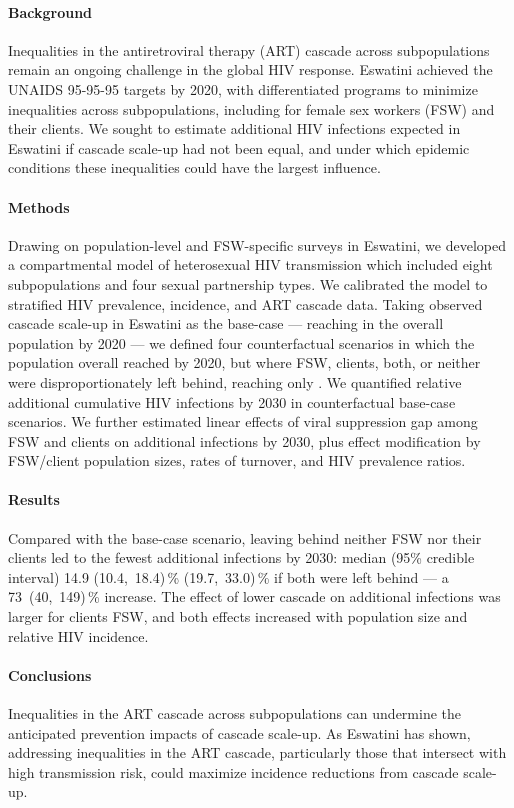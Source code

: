 \paragraph{Background}
Inequalities in the antiretroviral therapy (ART) cascade across subpopulations
remain an ongoing challenge in the global HIV response.
Eswatini achieved the UNAIDS 95-95-95 targets by 2020,
with differentiated programs to minimize inequalities across subpopulations,
including for female sex workers (FSW) and their clients.
We sought to estimate additional HIV infections expected in Eswatini
if cascade scale-up had not been equal,
and under which epidemic conditions these inequalities could have the largest influence.
\paragraph{Methods}
Drawing on population-level and FSW-specific surveys in Eswatini,
we developed a compartmental model of heterosexual HIV transmission
which included eight subpopulations and four sexual partnership types.
We calibrated the model to stratified HIV prevalence, incidence, and ART cascade data.
Taking observed cascade scale-up in Eswatini as the base-case
--- reaching \cashi in the overall population by 2020 ---
we defined four counterfactual scenarios in which
the population overall reached \casmd by 2020,
but where FSW, clients, both, or neither
were disproportionately left behind, reaching only \caslo.
We quantified relative additional cumulative HIV infections by 2030
in counterfactual \vs base-case scenarios.
We further estimated linear effects of
viral suppression gap among FSW and clients on additional infections by 2030, plus
effect modification by FSW/client population sizes, rates of turnover, and HIV prevalence ratios.
\paragraph{Results}
Compared with the base-case scenario, leaving behind neither FSW nor their clients
led to the fewest additional infections by 2030: median (95\% credible interval)
14.9 (10.4,~18.4)\,\%  (19.7,~33.0)\,\% if both were left behind %
--- a 73~(40,~149)\,\% increase. %
The effect of lower cascade on additional infections was larger for clients \vs FSW,
and both effects increased with population size and relative HIV incidence.
\paragraph{Conclusions}
Inequalities in the ART cascade across subpopulations
can undermine the anticipated prevention impacts of cascade scale-up.
As Eswatini has shown,
addressing inequalities in the ART cascade,
particularly those that intersect with high transmission risk,
could maximize incidence reductions from cascade scale-up.
